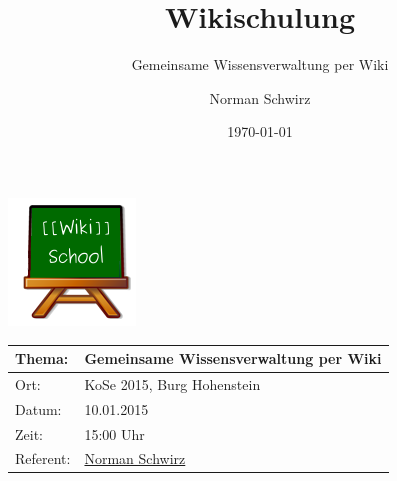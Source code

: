 \documentclass{beamer}
\begin{document}
\title{Wikischulung}
\subtitle{Gemeinsame Wissensverwaltung per Wiki}
\author{Norman Schwirz}
\subject{Gemeinsame Wissensverwaltung per Wiki}
\date{\today}

\begin{frame}
  \begin{center}
    \includegraphics[keepaspectratio=true, scale=1]{wikischool-logo}

    \bigskip

    \begin{tabular}{|l|l|}
      \toprule
      \textbf{Thema:} & \textbf{Gemeinsame Wissensverwaltung per Wiki} \\
      \midrule
       Ort:           & KoSe 2015, Burg Hohenstein \\ 
       Datum:         & 10.01.2015 \\
       Zeit:          & 15:00 Uhr \\ 
       Referent:      &  \href{http://www.stura.htw-dresden.de/members/NormanSchwirz}{Norman Schwirz}  \\ 
      \bottomrule
    \end{tabular}
  \end{center}
\end{frame}
\end{document}
